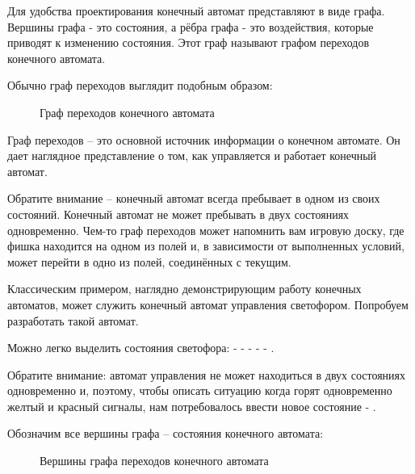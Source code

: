 \par{Для удобства проектирования конечный автомат представляют в виде графа. Вершины графа - это состояния, а рёбра графа - это воздействия, которые приводят к изменению состояния. Этот граф называют графом переходов конечного автомата.}

\par{Обычно граф переходов выглядит подобным образом:}

\begin{figure}[H]
  \centering
  \def\svgwidth{6cm}
  
  \caption{Граф переходов конечного автомата}
\end{figure}

\par{Граф переходов – это основной источник информации о конечном автомате. Он дает наглядное представление о том, как управляется и работает конечный автомат.}

\par{Обратите внимание – конечный автомат всегда пребывает в одном из своих состояний. Конечный автомат не может пребывать в двух состояниях одновременно.  Чем-то граф переходов может напомнить вам игровую доску, где фишка находится на одном из полей и, в зависимости от выполненных условий, может перейти в одно из полей, соединённых с текущим.}

\par{Классическим примером, наглядно демонстрирующим работу конечных автоматов, может служить конечный автомат управления светофором. Попробуем разработать такой автомат.}

\par{Можно легко выделить состояния светофора:  -  -  -  -  - .}

\par{Обратите внимание: автомат управления не может находиться в двух состояниях одновременно и, поэтому, чтобы описать ситуацию когда горят одновременно желтый и красный сигналы, нам потребовалось ввести новое состояние - .}

\par{Обозначим все вершины графа – состояния конечного автомата:}

\begin{figure}[H]
  \centering
  \def\svgwidth{\columnwidth}
  
  \caption{Вершины графа переходов конечного автомата}
\end{figure}


